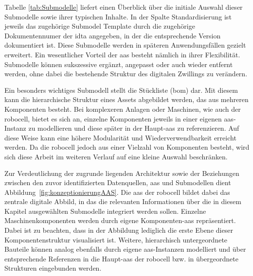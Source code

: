 Tabelle \ref{tab:Submodelle} liefert einen Überblick über die initiale Auswahl dieser Submodelle sowie ihrer typischen Inhalte.
In der Spalte Standardisierung ist jeweils das zugehörige Submodel Template durch die zugehörige Dokumentennumer der \acs{idta} angegeben, in der die entsprechende Version dokumentiert ist.
Diese Submodelle werden in späteren Anwendungsfällen gezielt erweitert.
Ein wesentlicher Vorteil der \acs{aas} besteht nämlich in ihrer Flexibilität.
Submodelle können sukszessive ergänzt, angepasst oder auch wieder entfernt werden, ohne dabei die bestehende Struktur des digitalen Zwillings zu verändern.




Ein besonders wichtiges Submodell stellt die Stückliste (\acs{bom}) dar. 
Mit diesem kann die hierarchische Struktur eines Assets abgebildet werden, das aus mehreren Komponenten besteht.
Bei komplexeren Anlagen oder Maschinen, wie auch der robocell, bietet es sich an, einzelne Komponenten jeweils in einer eigenen \acs{aas}-Instanz zu modellieren und diese später in der Haupt-\acs{aas} zu referenzieren.
Auf diese Weise kann eine höhere Modularität und Wiederverwendbarkeit erreicht werden.
Da die robocell jedoch aus einer Vielzahl von Komponenten besteht, wird sich diese Arbeit im weiteren Verlauf auf eine kleine Auswahl beschränken.

Zur Verdeutlichung der zugrunde liegenden Architektur sowie der Beziehungen zwischen den zuvor identifizierten Datenquellen, \acs{aas} und Submodellen dient Abbildung~\ref{fig:konzeptionierungAAS}.
Die \acs{aas} der robocell bildet dabei das zentrale digitale Abbild, in das die relevanten Informationen über die in diesem Kapitel ausgewählten Submodelle integriert werden sollen.
Einzelne Maschinenkomponenten werden durch eigene Komponenten-\acs{aas} repräsentiert. 
Dabei ist zu beachten, dass in der Abbildung lediglich die erste Ebene dieser Komponentenstruktur visualisiert ist.
Weitere, hierarchisch untergeordnete Bauteile können analog ebenfalls durch eigene \acs{aas}-Instanzen modelliert und über entsprechende Referenzen in die Haupt-\acs{aas} der robocell bzw. in übergeordnete Strukturen eingebunden werden.

